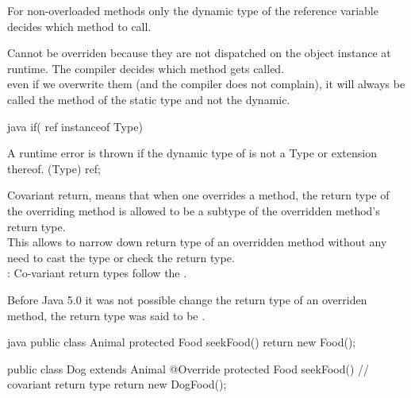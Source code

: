 \begin{notebox}[Note]\nospacing
  For non-overloaded methods only the dynamic type of the reference variable
  decides which method to call.
\end{notebox}
\begin{notebox}\nospacing
  Cannot be overriden because they are not dispatched on the object instance at
  runtime. The compiler decides which method gets called.\\
   even if we overwrite them (and the compiler does not complain),
  it will always be called the method of the static type and not the dynamic.
\end{notebox}
\begin{codeboxNl}{java}
  if( ref instanceof Type)
\end{codeboxNl}
\begin{notebox}[Note]\nospacing
    A runtime error is thrown if the dynamic type of  is not a Type or extension thereof. (Type) ref;
\end{notebox}
\begin{defnbox}\nospacing
  \begin{defn}\label{defn:covariantTying}
    Covariant return, means that when one overrides a method, the return type
    of the overriding method is allowed to be a subtype of the overridden
    method's return type.\\
    This allows to narrow down return type of an overridden method
    without any need to cast the type or check the return type.\\
    : Co-variant return types follow the .
  \end{defn}
\end{defnbox}
\begin{notebox}\nospacing
    Before Java 5.0 it was not possible change the return type of an overriden
    method, the return type was said to be .
\end{notebox}
\begin{codeboxNl}{java}
  public class Animal {
      protected Food seekFood() {
          return new Food();
      }
  }

  public class Dog extends Animal {
    @Override
    protected Food seekFood() {
        // covariant return type
        return new DogFood();
    }
}
\end{codeboxNl}
